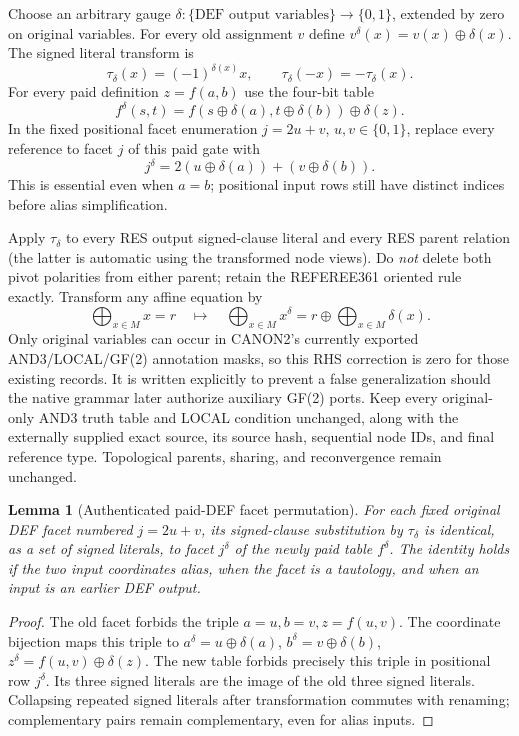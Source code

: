 \documentclass[11pt]{article}
\newtheorem{lemma}[theorem]{Lemma}
\begin{document}
Choose an arbitrary gauge \(\delta:\{\text{DEF output variables}\}\to\{0,1\}\),
extended by zero on original variables. For every old assignment \(v\) define
\(v^\delta(x)=v(x)\oplus\delta(x)\). The signed literal transform is
\[
 \tau_\delta(x)=(-1)^{\delta(x)}x,\qquad
 \tau_\delta(-x)=-\tau_\delta(x).
\]
For every paid definition \(z=f(a,b)\) use the four-bit table
\[
 f^\delta(s,t)=f(s\oplus\delta(a),t\oplus\delta(b))
                 \oplus\delta(z).
\]
In the fixed positional facet enumeration \(j=2u+v\), \(u,v\in\{0,1\}\),
replace every reference to facet \(j\) of this paid gate with
\[
 \boxed{j^\delta=2(u\oplus\delta(a))+(v\oplus\delta(b)).}
\]
This is essential even when \(a=b\); positional input rows still have distinct
indices before alias simplification.

Apply \(\tau_\delta\) to every RES output signed-clause literal and every
RES parent relation (the latter is automatic using the transformed node views).
Do \emph{not} delete both pivot polarities from either parent; retain the
REFEREE361 oriented rule exactly. Transform any affine equation by
\[
 \bigoplus_{x\in M}x=r
 \quad\mapsto\quad
 \bigoplus_{x\in M}x^\delta
 =r\oplus\bigoplus_{x\in M}\delta(x).
\]
Only original variables can occur in CANON2's currently exported
AND3/LOCAL/GF(2) annotation masks, so this RHS correction is zero for
those existing records. It is written explicitly to prevent a false
generalization should the native grammar later authorize auxiliary GF(2)
ports. Keep every original-only AND3 truth table and LOCAL condition
unchanged, along with the externally supplied exact source, its source
hash, sequential node IDs, and final reference type. Topological parents,
sharing, and reconvergence remain unchanged.

\begin{lemma}[Authenticated paid-DEF facet permutation]\label{l:facet}
For each fixed original DEF facet numbered \(j=2u+v\), its signed-clause
substitution by \(\tau_\delta\) is \emph{identical}, as a set of signed
literals, to facet \(j^\delta\) of the newly paid table \(f^\delta\).
The identity holds if the two input coordinates alias, when the facet is
a tautology, and when an input is an earlier DEF output.
\end{lemma}
\begin{proof}
The old facet forbids the triple
\(a=u,b=v,z=f(u,v)\). The coordinate bijection maps this triple to
\(a^\delta=u\oplus\delta(a)\),
\(b^\delta=v\oplus\delta(b)\),
\(z^\delta=f(u,v)\oplus\delta(z)\).
The new table forbids precisely this triple in positional row \(j^\delta\).
Its three signed literals are the image of the old three signed literals.
Collapsing repeated signed literals after transformation commutes with
renaming; complementary pairs remain complementary, even for alias inputs.
\end{proof}
\end{document}
